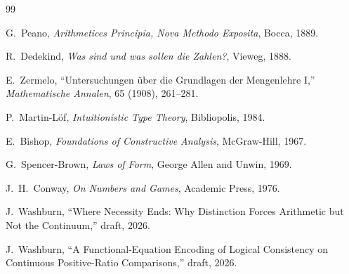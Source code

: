 \documentclass[11pt,a4paper]{article}
\theoremstyle{definition}
\theoremstyle{remark}
\begin{document}
\begin{thebibliography}{99}

G.~Peano,
\emph{Arithmetices Principia, Nova Methodo Exposita},
Bocca, 1889.

R.~Dedekind,
\emph{Was sind und was sollen die Zahlen?},
Vieweg, 1888.

E.~Zermelo,
``Untersuchungen \"uber die Grundlagen der Mengenlehre I,''
\emph{Mathematische Annalen}, 65 (1908), 261--281.

P.~Martin-L\"of,
\emph{Intuitionistic Type Theory},
Bibliopolis, 1984.

E.~Bishop,
\emph{Foundations of Constructive Analysis},
McGraw-Hill, 1967.

G.~Spencer-Brown,
\emph{Laws of Form},
George Allen and Unwin, 1969.

J.~H.~Conway,
\emph{On Numbers and Games},
Academic Press, 1976.

J.~Washburn,
``Where Necessity Ends: Why Distinction Forces Arithmetic but Not the
Continuum,'' draft, 2026.

J.~Washburn,
``A Functional-Equation Encoding of Logical Consistency on Continuous
Positive-Ratio Comparisons,'' draft, 2026.

\end{thebibliography}
\end{document}
